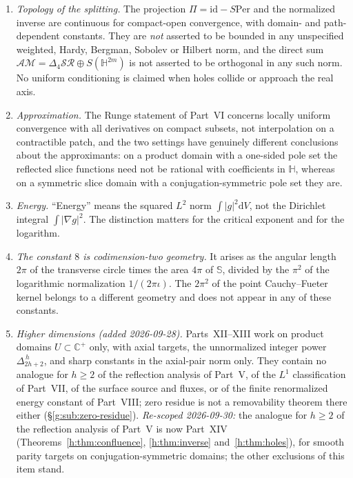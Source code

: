 \documentclass[11pt,a4paper]{article}
\numberwithin{equation}{section}
\theoremstyle{definition}
\theoremstyle{remark}
\theoremstyle{plain}
\newcommand{\HH}{\mathbb H}
\newcommand{\CC}{\mathbb C}
\newcommand{\SSS}{\mathbb S}
\newcommand{\Cplus}{\CC^{+}}
\newcommand{\lap}{\Delta_4}
\newcommand{\SR}{\mathcal{SR}}
\newcommand{\AM}{\mathcal{AM}}
\newcommand{\Per}{\mathrm{Per}}
\newcommand{\abs}[1]{\lvert #1\rvert}
\newcommand{\dd}{\mathrm d}
\newcommand{\lapH}{\Delta_{2h+2}^{\,h}}
\begin{document}
\begin{enumerate}[label=\textup{(B\arabic*)}]
period rank is infinite.
\item \emph{Topology of the splitting.} The projection $\Pi=\mathrm{id}-S\Per$
and the normalized inverse are continuous for compact-open convergence, with
domain- and path-dependent constants. They are \emph{not} asserted to be
bounded in any unspecified weighted, Hardy, Bergman, Sobolev or Hilbert
norm, and the direct sum $\AM=\lap\SR\oplus S(\HH^{2m})$ is not asserted to
be orthogonal in any such norm. No uniform conditioning is claimed when
holes collide or approach the real axis.
\item \emph{Approximation.} The Runge statement of Part~VI concerns locally
uniform convergence with all derivatives on compact subsets, not
interpolation on a contractible patch, and the two settings have genuinely
different conclusions about the approximants: on a product domain with a
one-sided pole set the reflected slice functions need not be rational with
coefficients in $\HH$, whereas on a symmetric slice domain with a
conjugation-symmetric pole set they are.
\item \emph{Energy.} ``Energy'' means the squared $L^2$ norm
$\int\abs g^2\dd V$, not the Dirichlet integral $\int\abs{\nabla g}^2$.
The distinction matters for the critical exponent and for the logarithm.
\item \emph{The constant $8$ is codimension-two geometry.} It arises as the
angular length $2\pi$ of the transverse circle times the area $4\pi$ of
$\SSS$, divided by the $\pi^2$ of the logarithmic normalization
$1/(2\pi\iota)$. The $2\pi^2$ of the point Cauchy--Fueter kernel belongs to
a different geometry and does not appear in any of these constants.
\item \emph{Higher dimensions (added 2026-09-28).} Parts~XII--XIII work on
product domains $U\subset\Cplus$ only, with axial targets, the unnormalized
integer power $\lapH$, and sharp constants in the axial-pair norm only. They
contain no analogue for $h\ge2$ of the reflection analysis of Part~V, of the
$L^1$ classification of Part~VII, of the surface source and fluxes, or of the
finite renormalized energy constant of Part~VIII; zero residue is not a
removability theorem there either (\S\ref{g:sub:zero-residue}).
\emph{Re-scoped 2026-09-30:} the analogue for $h\ge2$ of the reflection
analysis of Part~V is now Part~XIV (Theorems~\ref{h:thm:confluence},
\ref{h:thm:inverse} and~\ref{h:thm:holes}), for smooth parity targets on
conjugation-symmetric domains; the other exclusions of this item stand.
\end{enumerate}
\end{document}
